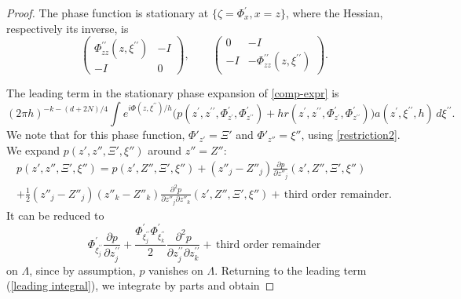 \documentclass[10pt, a4paper, twoside]{amsart}
\numberwithin{equation}{section}
\theoremstyle{remark}
\begin{document}
\begin{appendix}
\begin{proof}
	The phase function is stationary at $\{\zeta = \Phi^\prime_x, x = z\}$, where the Hessian, respectively its inverse, is $$\left( \begin{array}{cc} \Phi^{\prime\prime}_{zz}(z, \xi^{\prime\prime}) & - I\\ -I & 0  \end{array} \right), \quad\quad \left( \begin{array}{cc} 0 & - I\\ -I & - \Phi^{\prime\prime}_{zz}(z, \xi^{\prime\prime}) \end{array} \right).$$
	
	The leading term in the stationary phase expansion of \eqref{comp-expr} is 
	\begin{equation}\label{leading integral} 
	(2 \pi h)^{- k  - (d + 2N)/4} \int e^{i\Phi(z, \xi^{\prime\prime})/h} \Big( p(z^\prime, z^{\prime\prime}, \Phi_{z^\prime}^\prime, \Phi_{z^{\prime\prime}}^\prime) + h r(z^\prime, z^{\prime\prime}, \Phi_{z^\prime}^\prime, \Phi_{z^{\prime\prime}}^\prime) \Big) a(z^\prime, \xi^{\prime\prime}, h) \,  d\xi^{\prime\prime}.
	\end{equation} 
	We note that for this phase function, $\Phi'_{z'} = \Xi'$ and $\Phi'_{z''} = \xi''$, using \eqref{restriction2}. We expand $p(z', z'', \Xi', \xi'')$ around $z'' = Z''$: 
	\begin{equation}\begin{gathered}
	p(z', z'', \Xi', \xi'') = p(z', Z'', \Xi', \xi'') + (z''_j - Z''_j) \frac{\partial p}{\partial z''_j} (z', Z'', \Xi', \xi'') \\ + \frac1{2}{(z''_j - Z''_j)(z''_k - Z''_k)} \frac{\partial^2 p}{\partial z''_j \partial z''_k} (z', Z'', \Xi', \xi'') + 
	 \, \text{third order remainder}.
	\end{gathered} \end{equation} 
	 It can be reduced to $$\Phi^\prime_{\xi^{\prime\prime}_j}  \frac{\partial p}{\partial z^{\prime\prime}_j}  + \frac{\Phi^\prime_{\xi^{\prime\prime}_j} \Phi^\prime_{\xi^{\prime\prime}_k}}{2}  \frac{\partial^2 p}{\partial z^{\prime\prime}_j \partial z^{\prime\prime}_k} + \, \text{third order remainder}$$ on $\Lambda$, since by assumption, $p$ vanishes on $\Lambda$. Returning to the leading term (\ref{leading integral}), we integrate by parts and obtain 

\end{proof}
\end{appendix}
\end{document}
